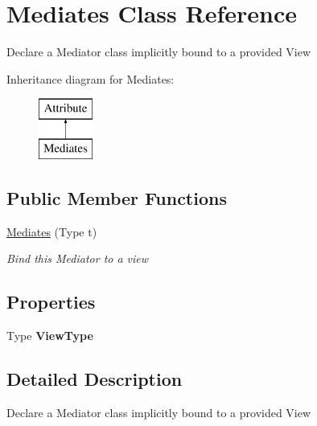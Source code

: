 \hypertarget{class_mediates}{\section{Mediates Class Reference}
\label{class_mediates}
}


Declare a Mediator class implicitly bound to a provided View  


Inheritance diagram for Mediates\-:\begin{figure}[H]
\begin{center}
\leavevmode
\includegraphics[height=2.000000cm]{class_mediates}
\end{center}
\end{figure}
\subsection*{Public Member Functions}
\begin{DoxyCompactItemize}
\item 
\hyperlink{class_mediates_ac0ef2f8f4a74eade0d15fd478d3ba2f9}{Mediates} (Type t)
\begin{DoxyCompactList}\small\item\em Bind this Mediator to a view \end{DoxyCompactList}\end{DoxyCompactItemize}
\subsection*{Properties}
\begin{DoxyCompactItemize}
\item 
\hypertarget{class_mediates_a34cb544d086a849c0abf79a8fd9e6c22}{Type {\bfseries View\-Type}}\label{class_mediates_a34cb544d086a849c0abf79a8fd9e6c22}

\end{DoxyCompactItemize}


\subsection{Detailed Description}
Declare a Mediator class implicitly bound to a provided View 



